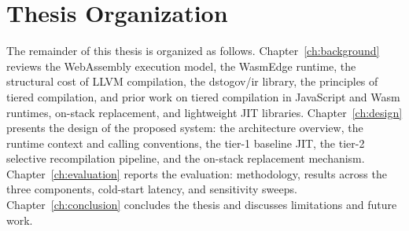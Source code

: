\section{Thesis Organization}
\label{sec:intro:organization}

The remainder of this thesis is organized as follows. Chapter~\ref{ch:background} reviews the WebAssembly execution model, the WasmEdge runtime, the structural cost of LLVM compilation, the dstogov/ir library, the principles of tiered compilation, and prior work on tiered compilation in JavaScript and Wasm runtimes, on-stack replacement, and lightweight JIT libraries. Chapter~\ref{ch:design} presents the design of the proposed system: the architecture overview, the runtime context and calling conventions, the tier-1 baseline JIT, the tier-2 selective recompilation pipeline, and the on-stack replacement mechanism. Chapter~\ref{ch:evaluation} reports the evaluation: methodology, results across the three components, cold-start latency, and sensitivity sweeps. Chapter~\ref{ch:conclusion} concludes the thesis and discusses limitations and future work.
